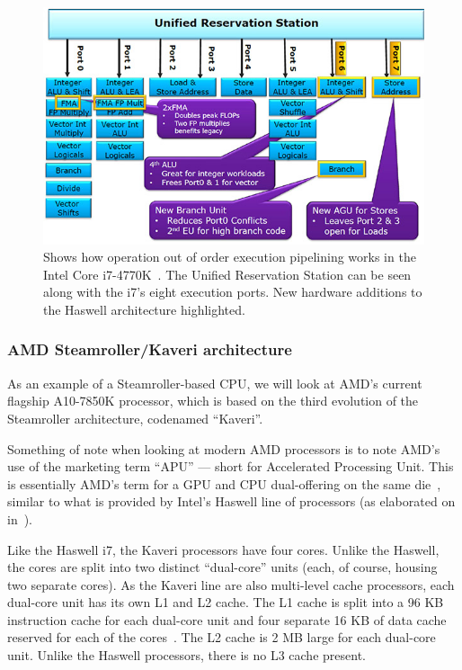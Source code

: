 \documentclass[a4paper,11pt]{article}
\begin{document}
\begin{figure}[ht]
  \centering
  \includegraphics[scale=0.5]{img/new-ports}
  \caption{Shows how operation out of order execution pipelining works in the Intel Core i7-4770K~\cite{web:TomsHWCorei7}. The Unified Reservation Station can be seen along with the i7's eight execution ports. New hardware additions to the Haswell architecture highlighted.}
\label{fig:haswell-new-ports}
\end{figure}

\subsubsection{AMD Steamroller/Kaveri architecture} %
\label{subsub:amd_steamroller_architecture}
As an example of a Steamroller-based CPU, we will look at AMD's current flagship A10-7850K processor, which is based on the third evolution of the Steamroller architecture, codenamed ``Kaveri''.

Something of note when looking at modern AMD processors is to note AMD's use of the marketing term ``APU'' --- short for Accelerated Processing Unit. This is essentially AMD's term for a GPU and CPU dual-offering on the same die~\cite{web:AMDAPU}, similar to what is provided by Intel's Haswell line of processors (as elaborated on in~).

Like the Haswell i7, the Kaveri processors have four cores. Unlike the Haswell, the cores are split into two distinct ``dual-core'' units (each, of course, housing two separate cores). As the Kaveri line are also multi-level cache processors, each dual-core unit has its own L1 and L2 cache. The L1 cache is split into a 96 KB instruction cache for each dual-core unit and four separate 16 KB of data cache reserved for each of the cores~\cite{web:Guru3dKaveri}. The L2 cache is 2 MB large for each dual-core unit. Unlike the Haswell processors, there is no L3 cache present.
\end{document}
